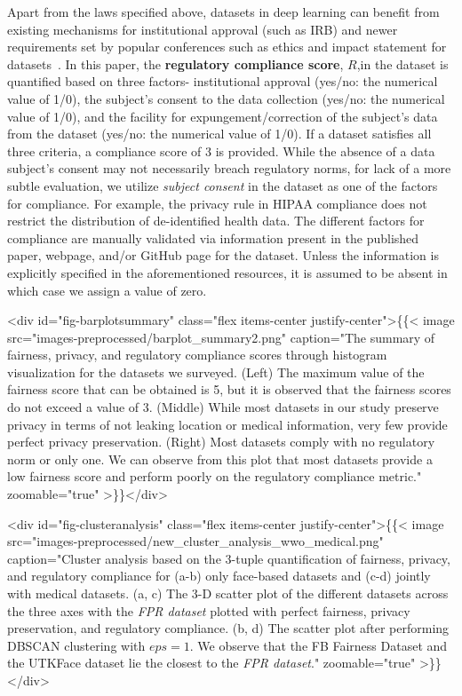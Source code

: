 \documentclass[journal]{IEEEtran}
\begin{document}
Apart from the laws specified above, datasets in deep learning can benefit from existing mechanisms for institutional approval (such as IRB) and newer requirements set by popular conferences such as ethics and impact statement for datasets~\cite{EthicsCVPR}. In this paper, the \textbf{regulatory compliance score}, $R$,in the dataset is quantified based on three factors- institutional approval (yes/no: the numerical value of 1/0), the subject's consent to the data collection (yes/no: the numerical value of 1/0), and the facility for expungement/correction of the subject's data from the dataset (yes/no: the numerical value of 1/0). If a dataset satisfies all three criteria, a compliance score of $3$ is provided. While the absence of a data subject's consent may not necessarily breach regulatory norms, for lack of a more subtle evaluation, we utilize \textit{subject consent} in the dataset as one of the factors for compliance. For example, the privacy rule in HIPAA compliance does not restrict the distribution of de-identified health data. The different factors for compliance are manually validated via information present in the published paper, webpage, and/or GitHub page for the dataset. Unless the information is explicitly specified in the aforementioned resources, it is assumed to be absent in which case we assign a value of zero. 

<div id="fig-barplotsummary" class="flex items-center justify-center">\{\{< image src="images-preprocessed/barplot_summary2.png" caption="The summary of fairness, privacy, and regulatory compliance scores through histogram visualization for the datasets we surveyed. (Left) The maximum value of the fairness score that can be obtained is 5, but it is observed that the fairness scores do not exceed a value of 3. (Middle) While most datasets in our study preserve privacy in terms of not leaking location or medical information, very few provide perfect privacy preservation. (Right) Most datasets comply with no regulatory norm or only one. We can observe from this plot that most datasets provide a low fairness score and perform poorly on the regulatory compliance metric." zoomable="true" >\}\}</div>



<div id="fig-clusteranalysis" class="flex items-center justify-center">\{\{< image src="images-preprocessed/new_cluster_analysis_wwo_medical.png" caption="Cluster analysis based on the 3-tuple quantification of fairness, privacy, and regulatory compliance for (a-b) only face-based datasets and (c-d) jointly with medical datasets. (a, c) The 3-D scatter plot of the different datasets across the three axes with the \textit{FPR dataset} plotted with perfect fairness, privacy preservation, and regulatory compliance. (b, d) The scatter plot after performing DBSCAN clustering with $eps=1$. We observe that the FB Fairness Dataset and the UTKFace dataset lie the closest to the \textit{FPR dataset}." zoomable="true" >\}\}</div>
\end{document}
